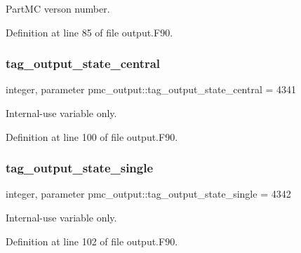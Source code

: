 Part\+MC verson number. 



Definition at line 85 of file output.\+F90.

\mbox{\label{namespacepmc__output_af6ce65b9d2ef20e03fc0ed4a4b478a44}} 
\subsubsection{\texorpdfstring{tag\+\_\+output\+\_\+state\+\_\+central}{tag\_output\_state\_central}}
{\footnotesize\ttfamily integer, parameter pmc\+\_\+output\+::tag\+\_\+output\+\_\+state\+\_\+central = 4341}



Internal-\/use variable only. 



Definition at line 100 of file output.\+F90.

\mbox{\label{namespacepmc__output_a7385761091e132dc082a72fa05a83180}} 
\subsubsection{\texorpdfstring{tag\+\_\+output\+\_\+state\+\_\+single}{tag\_output\_state\_single}}
{\footnotesize\ttfamily integer, parameter pmc\+\_\+output\+::tag\+\_\+output\+\_\+state\+\_\+single = 4342}



Internal-\/use variable only. 



Definition at line 102 of file output.\+F90.

